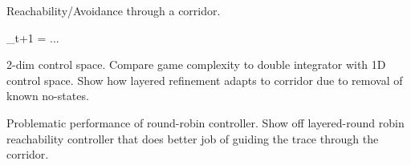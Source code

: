 Reachability/Avoidance through a corridor.

\startformula
    \VecX_{t+1} = ...
\stopformula


2-dim control space.
Compare game complexity to double integrator with 1D control space.
Show how layered refinement adapts to corridor due to removal of known no-states.

Problematic performance of round-robin controller.
Show off layered-round robin reachability controller that does better job of guiding the trace through the corridor.

